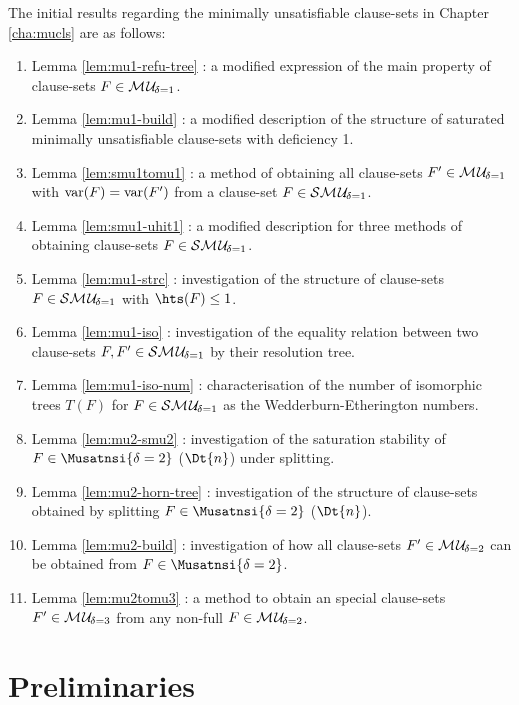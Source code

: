 \documentclass{report}
\begin{document}
The initial results regarding the minimally unsatisfiable clause-sets in Chapter \ref{cha:mucls} are as follows:
  \begin{enumerate}
  \item Lemma \ref{lem:mu1-refu-tree} : a modified expression of the main property of clause-sets $F \in \mathcal{M\hspace{0.8pt}U}_{\!\delta=1}$.
  \item Lemma \ref{lem:mu1-build} : a modified description of the structure of saturated minimally unsatisfiable clause-sets with deficiency 1.
  \item Lemma \ref{lem:smu1tomu1} : a method of obtaining all clause-sets $F' \in \mathcal{M\hspace{0.8pt}U}_{\!\delta=1}$ with $\operatorname{var}(F)=\operatorname{var}(F')$ from a clause-set $F \in  \mathcal{S}\mathcal{M\hspace{0.8pt}U}_{\!\delta=1}$.
  \item Lemma \ref{lem:smu1-uhit1} : a modified description for three methods of obtaining clause-sets $F \in \mathcal{S}\mathcal{M\hspace{0.8pt}U}_{\!\delta=1}$.
  \item Lemma \ref{lem:mu1-strc} : investigation of the structure of clause-sets $F \in \mathcal{S}\mathcal{M\hspace{0.8pt}U}_{\!\delta=1}$ with $\hts(F) \le 1$.
  \item Lemma \ref{lem:mu1-iso} : investigation of the equality relation between two clause-sets $F,F' \in \mathcal{S}\mathcal{M\hspace{0.8pt}U}_{\!\delta=1}$ by their resolution tree.
  \item Lemma \ref{lem:mu1-iso-num} : characterisation of the number of isomorphic trees $T(F)$ for $F \in  \mathcal{S}\mathcal{M\hspace{0.8pt}U}_{\!\delta=1}$ as the Wedderburn-Etherington numbers.
  \item Lemma \ref{lem:mu2-smu2} : investigation of the saturation stability of $F \in  \Musatnsi{\delta=2}$ ($\Dt{n}$) under splitting.
  \item Lemma \ref{lem:mu2-horn-tree} : investigation of the structure of clause-sets obtained by splitting $F \in  \Musatnsi{\delta=2}$ ($\Dt{n}$).
  \item Lemma \ref{lem:mu2-build} : investigation of how all clause-sets $F' \in \mathcal{M\hspace{0.8pt}U}_{\!\delta=2}$ can be obtained from $F \in  \Musatnsi{\delta=2}$.
  \item Lemma \ref{lem:mu2tomu3} : a method to obtain an special clause-sets $F' \in \mathcal{M\hspace{0.8pt}U}_{\!\delta=3}$ from any non-full $F \in  \mathcal{M\hspace{0.8pt}U}_{\!\delta=2}$.
  \end{enumerate}

\chapter{Preliminaries}
\label{cha:Preliminaries}
\end{document}
